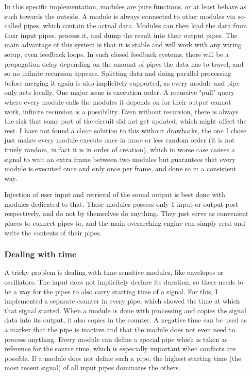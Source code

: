 \documentclass[11pt,a4paper]{article}
\begin{document}
In this specific implementation, modules are pure functions, or at least behave as such towards the outside. A module is always connected to other modules via so-called pipes, which contain the actual data. Modules can then load the data from their input pipes, process it, and dump the result into their output pipes. The main advantage of this system is that it is stable and will work with any wiring setup, even feedback loops. In such closed feedback systems, there will be a propagation delay depending on the amount of pipes the data has to travel, and so no infinite recursion appears. Splitting data and doing parallel processing before merging it again is also implicitely supported, as every module and pipe only acts locally.
One major issue is execution order. A recursive "pull" query where every module calls the modules it depends on for their output cannot work, infinite recursion is a possibility. Even without recursion, there is always the risk that some part of the circuit did not get updated, which might affect the rest. I have not found a clean solution to this without drawbacks, the one I chose just makes every module execute once in more or less random order (it is not truely random, in fact it is in order of creation), which in worse case causes a signal to wait an extra frame between two modules but guarantees that every module is executed once and only once per frame, and done so in a consistent way.

Injection of user input and retrieval of the sound output is best done with modules dedicated to that. These modules possess only 1 input or output port respectively, and do not by themselves do anything. They just serve as convenient places to connect pipes to, and the main overarching engine can simply read and write the contents of their pipes.

\subsubsection{Dealing with time}

A tricky problem is dealing with time-sensitive modules, like envelopes or oscillators. The input does not implicitely declare its duration, so there needs to be a way for the pipes to also carry starting time of a signal. For this, I implemented a separate counter in every pipe, which showed the time at which that signal started. When a module is done with processing and copies the signal data into its output, it also copies in the counter. A negative time can be used as a marker that the pipe is inactive and that the module does not even need to process anything. Every module can define a special pipe which is taken as reference for the source time, which is especially important when conflicts are possible. If a module does not define such a pipe, the highest starting time (the most recent signal) of all input pipes dominates the others.
\end{document}
